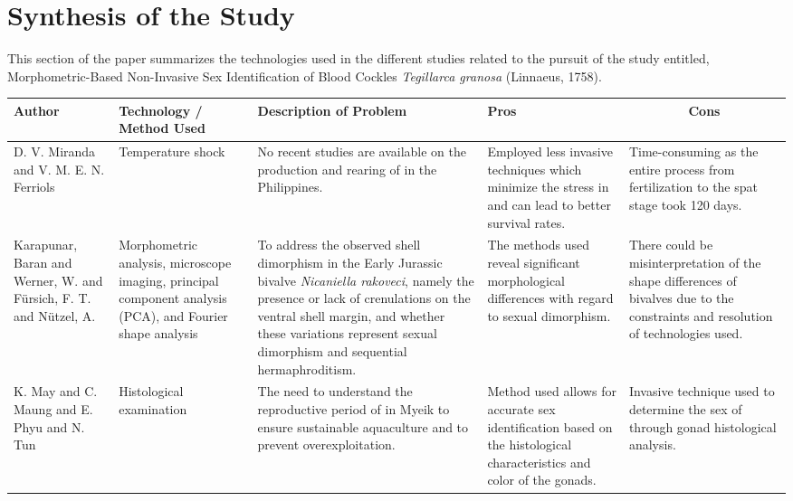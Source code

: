 \section{Synthesis of the Study}
This section of the paper summarizes the technologies used in the different studies related to the pursuit of the study entitled, Morphometric-Based Non-Invasive Sex Identification of Blood Cockles \textit{Tegillarca granosa} (Linnaeus, 1758).

\begin{table}[]
	\centering
	\renewcommand{\arraystretch}{3} 
	\begin{adjustbox}{scale=0.55,center}
	\normalsize
	\begin{tabular}{|p{5cm}|p{5cm}|p{8cm}|p{8cm}|p{8cm}|}
		\hline
		\centering
		\textbf{Author} &
		\centering
		\textbf{Technology / Method Used} &
		\centering
		\textbf{Description of Problem} &
		\centering
		\textbf{Pros} &
		\multicolumn{1}{c|}{\textbf{Cons}} \\ \hline
		
		D. V. Miranda and V. M. E. N. Ferriols &
		Temperature shock &
		No recent studies are available on the production and rearing of \textit{\Tgranosa} in the Philippines. &
		Employed less invasive techniques which minimize the stress in \textit{\Tgranosa} and can lead to better survival rates. &
		Time-consuming as the entire process from fertilization to the spat stage took 120 days. \\ \hline
		
		Karapunar, Baran and Werner, W. and Fürsich, F. T. and Nützel, A. &
		Morphometric analysis, microscope imaging, principal component analysis (PCA), and Fourier shape analysis &
		To address the observed shell dimorphism in the Early Jurassic bivalve \textit{Nicaniella rakoveci}, namely the presence or lack of crenulations on the ventral shell margin, and whether these variations represent sexual dimorphism and sequential hermaphroditism. &
		The methods used reveal significant morphological differences with regard to sexual dimorphism. &
		There could be misinterpretation of the shape differences of bivalves due to the constraints and resolution of technologies used. \\ \hline
		
		K. May and C. Maung and E. Phyu and N. Tun &
		Histological examination &
		The need to understand the reproductive period of \textit{\Tgranosa} in Myeik to ensure sustainable aquaculture and to prevent overexploitation. &
		Method used allows for accurate sex identification based on the histological characteristics and color of the gonads. &
		Invasive technique used to determine the sex of \textit{\Tgranosa} through gonad histological analysis. \\ \hline
		

\end{tabular}
\end{adjustbox}
\end{table}
